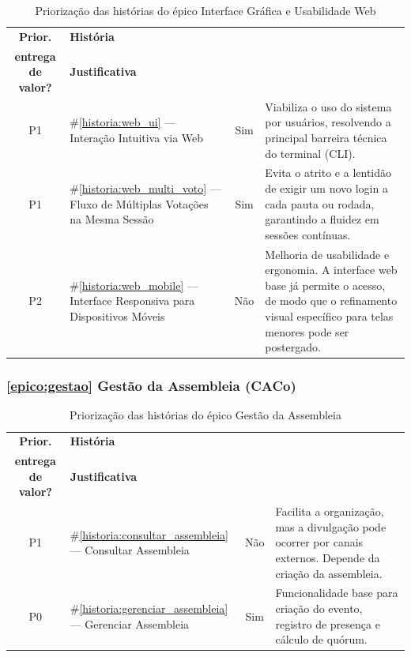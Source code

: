 \documentclass[12pt,a4paper]{article}
\newcounter{epico}
\newcounter{historia}
\begin{document}
\begin{table}[H]
\centering
\small
\begin{tabular}{|c|m{3.4cm}|c|m{6.7cm}|}
\hline
\rowcolor[gray]{0.9}
\textbf{Prior.} &
\textbf{História} &
\makecell{\textbf{Incluído na primeira}\\
\textbf{entrega de valor?}} &
\textbf{Justificativa} \\
\hline

P1 &
\#\ref{historia:web_ui} --- Interação Intuitiva via Web &
 Sim & 
 Viabiliza o uso do sistema por usuários, resolvendo a principal barreira técnica do terminal (CLI).
 \\
\hline

P1 &
\#\ref{historia:web_multi_voto} --- Fluxo de Múltiplas Votações na Mesma Sessão &
 Sim & 
 Evita o atrito e a lentidão de exigir um novo login a cada pauta ou rodada, garantindo a fluidez em sessões contínuas.
 \\
\hline

P2 &
\#\ref{historia:web_mobile} --- Interface Responsiva para Dispositivos Móveis &
 Não & 
 Melhoria de usabilidade e ergonomia. A interface web base já permite o acesso, de modo que o refinamento visual específico para telas menores pode ser postergado.
 \\
\hline

\end{tabular}
\caption{Priorização das histórias do épico Interface Gráfica e Usabilidade Web}
\end{table}

\subsubsection{\ref{epico:gestao} Gestão da Assembleia (CACo)}

\begin{table}[H]
\centering
\small
\begin{tabular}{|c|m{3.4cm}|c|m{6.7cm}|}
\hline
\rowcolor[gray]{0.9}
\textbf{Prior.} &
\textbf{História} &
\makecell{\textbf{Incluído na primeira}\\
\textbf{entrega de valor?}} &
\textbf{Justificativa} \\
\hline

P1 &
\#\ref{historia:consultar_assembleia} --- Consultar Assembleia &
Não &
Facilita a organização, mas a divulgação pode ocorrer por canais externos. Depende da criação da assembleia. \\

\hline
P0 &
\#\ref{historia:gerenciar_assembleia} --- Gerenciar Assembleia &
Sim &
Funcionalidade base para criação do evento, registro de presença e cálculo de quórum. \\

\hline

\end{tabular}
\caption{Priorização das histórias do épico Gestão da Assembleia}
\end{table}
\end{document}
